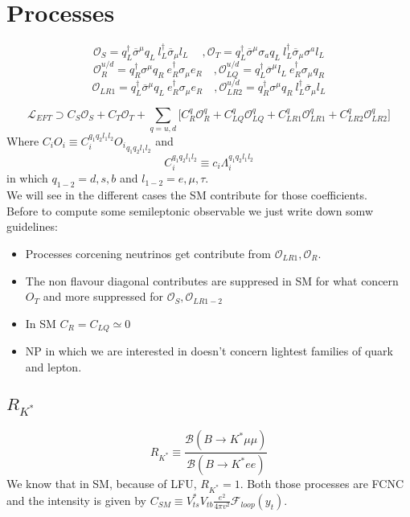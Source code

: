\documentclass{article}
\begin{document}
\section{Processes}
\[
\mathcal{O}_S= q_L^\dagger \overline{\sigma}^\mu q_L \ l_L^\dagger \overline{\sigma}_\mu l_L \  \quad,\mathcal{O}_T=q_L^\dagger \overline{\sigma}^\mu  \sigma_a q_L \ l_L^\dagger \overline{\sigma}_\mu \sigma^a l_L
\]
\[
\mathcal{O}^{u/d}_R = q_R^\dagger \sigma^\mu q_R \ e_R^\dagger \sigma_\mu e_R \quad, \mathcal{O}_{LQ}^{u/d}= q_L^\dagger \overline{\sigma}^\mu l_L \ e_R^\dagger \sigma_\mu q_R
\]
\[
\mathcal{O}_{LR1}= q_L^\dagger \overline{\sigma}^\mu q_L \ e_R^\dagger \sigma_\mu e_R \quad, \mathcal{O}_{LR2}^{u/d}= q_R^\dagger \sigma^\mu q_R \ l_L^\dagger \overline{\sigma}_\mu l_L 
\]

\[
\mathcal{L}_{EFT} \supset C_S \mathcal{O}_S + C_T \mathcal{O}_T + \sum_{q=u,d}\big[C_{R}^q \mathcal{O}_{R}^q + C_{LQ}^q \mathcal{O}_{LQ}^q + C_{LR1}^q \mathcal{O}_{LR1}^q + C_{LR2}^q \mathcal{O}_{LR2}^q \big]
\]
Where $C_i O_i \equiv C^{q_1 q_2 l_1 l_2}_i {O_i}_{q_1 q_2 l_1 l_2}$ and
\[
C_i^{q_1 q_2 l_1 l_2} \equiv c_i \Lambda_i^{q_1 q_2 l_1 l_2}
\]
in which $q_{1-2}=d,s,b$ and $l_{1-2}= e,\mu , \tau$.\\
We will see in the different cases the SM contribute for those coefficients.\\

Before to compute some semileptonic observable we just write down somw guidelines:
\begin{itemize}
\item Processes corcening neutrinos get contribute from $\mathcal{O}_{LR1}, \mathcal{O}_R$.
\item The non flavour diagonal contributes are suppresed in SM for what concern $O_T$ and more suppressed for $\mathcal{O}_S, \mathcal{O}_{LR1-2} $
\item In SM $C_R= C_{LQ} \simeq 0$
\item NP in which we are interested in doesn't concern lightest families of quark and lepton.
\end{itemize}


\subsection{$R_{K^*}$}
\[
R_{K^*} \equiv \frac{\mathcal{B}(B \rightarrow K^* \mu \mu)}{\mathcal{B}(B \rightarrow K^* e e )}
\]
We know that in SM, because of LFU, $R_{K^*}=1$. Both those processes are FCNC and the intensity is given by $C_{SM} \equiv V_{ts}^* V_{tb} \frac{e^2}{4 \pi v^2} \mathcal{F}_{loop}(y_t)$.
\end{document}
